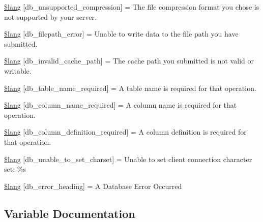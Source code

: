 \begin{DoxyCompactItemize}
\item 
\hyperlink{db__lang_8php_ae745d23d59478f529442768816df6f36}{\$lang} \mbox{[}\textquotesingle{}db\+\_\+unsupported\+\_\+compression\textquotesingle{}\mbox{]} = \textquotesingle{}The file compression format you chose is not supported by your server.\textquotesingle{}
\item 
\hyperlink{db__lang_8php_a0519c50a806cec99f29b499aec2582e5}{\$lang} \mbox{[}\textquotesingle{}db\+\_\+filepath\+\_\+error\textquotesingle{}\mbox{]} = \textquotesingle{}Unable to write data to the file path you have submitted.\textquotesingle{}
\item 
\hyperlink{db__lang_8php_a67157df2896b342e247ab744adf2b9e5}{\$lang} \mbox{[}\textquotesingle{}db\+\_\+invalid\+\_\+cache\+\_\+path\textquotesingle{}\mbox{]} = \textquotesingle{}The cache path you submitted is not valid or writable.\textquotesingle{}
\item 
\hyperlink{db__lang_8php_a2899cf8f7246d7fa97660ea52856ade5}{\$lang} \mbox{[}\textquotesingle{}db\+\_\+table\+\_\+name\+\_\+required\textquotesingle{}\mbox{]} = \textquotesingle{}A table name is required for that operation.\textquotesingle{}
\item 
\hyperlink{db__lang_8php_ac87ab86a1f105d87327480b6d0659b13}{\$lang} \mbox{[}\textquotesingle{}db\+\_\+column\+\_\+name\+\_\+required\textquotesingle{}\mbox{]} = \textquotesingle{}A column name is required for that operation.\textquotesingle{}
\item 
\hyperlink{db__lang_8php_ad0ba270704ec81f8f89e486a18660354}{\$lang} \mbox{[}\textquotesingle{}db\+\_\+column\+\_\+definition\+\_\+required\textquotesingle{}\mbox{]} = \textquotesingle{}A column definition is required for that operation.\textquotesingle{}
\item 
\hyperlink{db__lang_8php_ab22396948e25460833329cb8786ad831}{\$lang} \mbox{[}\textquotesingle{}db\+\_\+unable\+\_\+to\+\_\+set\+\_\+charset\textquotesingle{}\mbox{]} = \textquotesingle{}Unable to set client connection character set\+: \%s\textquotesingle{}
\item 
\hyperlink{db__lang_8php_a4be34cea2490b0d41689b65e52286658}{\$lang} \mbox{[}\textquotesingle{}db\+\_\+error\+\_\+heading\textquotesingle{}\mbox{]} = \textquotesingle{}A Database Error Occurred\textquotesingle{}
\end{DoxyCompactItemize}


\subsection{Variable Documentation}
\hypertarget{db__lang_8php_a0c2ed2613101d37cbaba14042530c16d}{}
